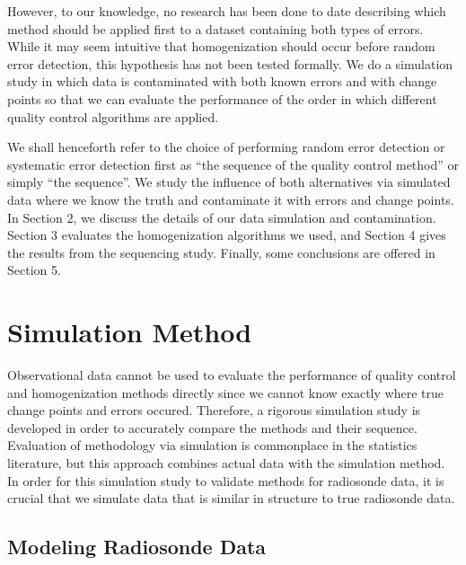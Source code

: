 \documentclass[12pt]{article}
\begin{document}
\begin{doublespacing}
However, to our knowledge, no research has been done to date describing which method should be applied first to a dataset containing both types of errors.  While it may seem intuitive that homogenization should occur before random error detection, this hypothesis has not been tested formally.  We do a simulation study in which data is contaminated with both known errors and with change points so that we can evaluate the performance of the order in which different quality control algorithms are applied.

We shall henceforth refer to the choice of performing random error detection or systematic error detection first  as ``the sequence of the quality control method'' or simply ``the sequence''.  We study the influence of both alternatives via simulated data where we know the truth and contaminate it with errors and change points.  In Section 2, we discuss the details of our data simulation and contamination.  Section 3 evaluates the homogenization algorithms we used, and Section 4 gives the results from the sequencing study.  Finally, some conclusions are offered in Section 5.

\section{Simulation Method}
Observational data cannot be used to evaluate the performance of quality control and homogenization methods directly since we cannot know exactly where true change points and errors occured.  Therefore, a rigorous simulation study is developed in order to accurately compare the methods and their sequence.  Evaluation of methodology via simulation is commonplace in the statistics literature, but this approach combines actual data with the simulation method.  In order for this simulation study to validate methods for radiosonde data, it is crucial that we simulate data that is similar in structure to true radiosonde data.

\subsection{Modeling Radiosonde Data}
\label{ssec:model}


\end{doublespacing}
\end{document}
